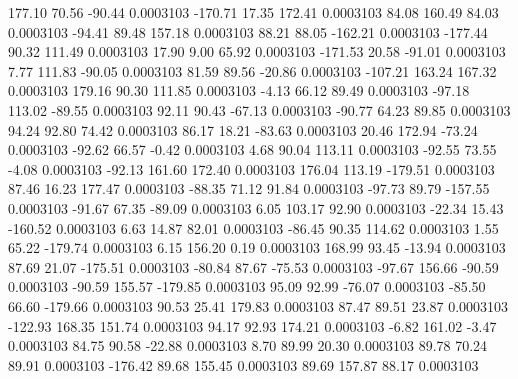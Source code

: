       177.10       70.56      -90.44     0.0003103
     -170.71       17.35      172.41     0.0003103
       84.08      160.49       84.03     0.0003103
      -94.41       89.48      157.18     0.0003103
       88.21       88.05     -162.21     0.0003103
     -177.44       90.32      111.49     0.0003103
       17.90        9.00       65.92     0.0003103
     -171.53       20.58      -91.01     0.0003103
        7.77      111.83      -90.05     0.0003103
       81.59       89.56      -20.86     0.0003103
     -107.21      163.24      167.32     0.0003103
      179.16       90.30      111.85     0.0003103
       -4.13       66.12       89.49     0.0003103
      -97.18      113.02      -89.55     0.0003103
       92.11       90.43      -67.13     0.0003103
      -90.77       64.23       89.85     0.0003103
       94.24       92.80       74.42     0.0003103
       86.17       18.21      -83.63     0.0003103
       20.46      172.94      -73.24     0.0003103
      -92.62       66.57       -0.42     0.0003103
        4.68       90.04      113.11     0.0003103
      -92.55       73.55       -4.08     0.0003103
      -92.13      161.60      172.40     0.0003103
      176.04      113.19     -179.51     0.0003103
       87.46       16.23      177.47     0.0003103
      -88.35       71.12       91.84     0.0003103
      -97.73       89.79     -157.55     0.0003103
      -91.67       67.35      -89.09     0.0003103
        6.05      103.17       92.90     0.0003103
      -22.34       15.43     -160.52     0.0003103
        6.63       14.87       82.01     0.0003103
      -86.45       90.35      114.62     0.0003103
        1.55       65.22     -179.74     0.0003103
        6.15      156.20        0.19     0.0003103
      168.99       93.45      -13.94     0.0003103
       87.69       21.07     -175.51     0.0003103
      -80.84       87.67      -75.53     0.0003103
      -97.67      156.66      -90.59     0.0003103
      -90.59      155.57     -179.85     0.0003103
       95.09       92.99      -76.07     0.0003103
      -85.50       66.60     -179.66     0.0003103
       90.53       25.41      179.83     0.0003103
       87.47       89.51       23.87     0.0003103
     -122.93      168.35      151.74     0.0003103
       94.17       92.93      174.21     0.0003103
       -6.82      161.02       -3.47     0.0003103
       84.75       90.58      -22.88     0.0003103
        8.70       89.99       20.30     0.0003103
       89.78       70.24       89.91     0.0003103
     -176.42       89.68      155.45     0.0003103
       89.69      157.87       88.17     0.0003103
